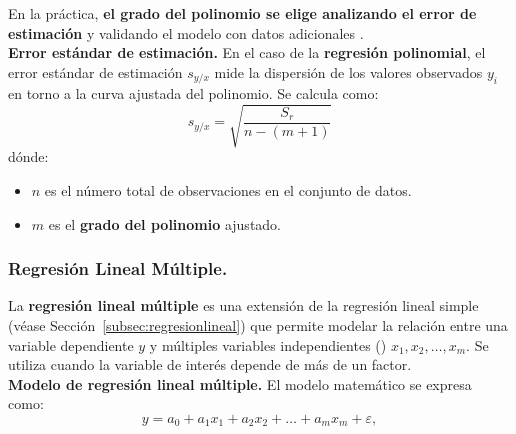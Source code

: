 \documentclass{article}
\begin{document}
En la práctica, \textbf{el grado del polinomio se elige analizando el error de estimación} y validando el modelo con datos adicionales \cite{polinomico4}.\\

\noindent \textbf{Error estándar de estimación.} En el caso de la \textbf{regresión polinomial}, el error estándar de estimación $s_{y/x}$ mide la dispersión de los valores observados $y_i$ en torno a la curva ajustada del polinomio. Se calcula como:
\begin{equation}
    s_{y/x} = \sqrt{\frac{S_r}{n - (m + 1)}}
\end{equation}
dónde:
\begin{itemize}
    \item $n$ es el número total de observaciones en el conjunto de datos.
    \item $m$ es el \textbf{grado del polinomio} ajustado.
\end{itemize}

\newpage
\subsubsection{Regresión Lineal Múltiple.}
La \textbf{regresión lineal múltiple} es una extensión de la regresión lineal simple (véase Sección~\ref{subsec:regresionlineal}) que permite modelar la relación entre una variable dependiente $y$ y múltiples variables independientes (\cite{polinomico3}) $x_1, x_2, \dots, x_m$. Se utiliza cuando la variable de interés depende de más de un factor.\\

\noindent \textbf{Modelo de regresión lineal múltiple.}  
El modelo matemático se expresa como:
\begin{equation}
    y = a_0 + a_1 x_1 + a_2 x_2 + \dots + a_m x_m + \varepsilon,
\end{equation}
\vspace{2mm}
\end{document}
